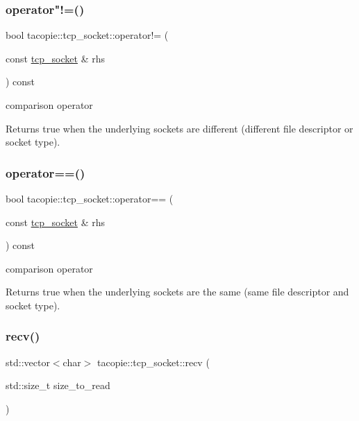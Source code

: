 \subsubsection{\texorpdfstring{operator"!=()}{operator!=()}}
{\footnotesize\ttfamily bool tacopie\+::tcp\+\_\+socket\+::operator!= (\begin{DoxyParamCaption}\item[{const \hyperlink{classtacopie_1_1tcp__socket}{tcp\+\_\+socket} \&}]{rhs }\end{DoxyParamCaption}) const}

comparison operator

\begin{DoxyReturn}{Returns}
true when the underlying sockets are different (different file descriptor or socket type). 
\end{DoxyReturn}
\mbox{\label{classtacopie_1_1tcp__socket_a69fde61058ab72d88ce48f557d8216cf}} 
\subsubsection{\texorpdfstring{operator==()}{operator==()}}
{\footnotesize\ttfamily bool tacopie\+::tcp\+\_\+socket\+::operator== (\begin{DoxyParamCaption}\item[{const \hyperlink{classtacopie_1_1tcp__socket}{tcp\+\_\+socket} \&}]{rhs }\end{DoxyParamCaption}) const}

comparison operator

\begin{DoxyReturn}{Returns}
true when the underlying sockets are the same (same file descriptor and socket type). 
\end{DoxyReturn}
\mbox{\label{classtacopie_1_1tcp__socket_a0d6d30258a902d12b3c2c62644756685}} 
\subsubsection{\texorpdfstring{recv()}{recv()}}
{\footnotesize\ttfamily std\+::vector$<$char$>$ tacopie\+::tcp\+\_\+socket\+::recv (\begin{DoxyParamCaption}\item[{std\+::size\+\_\+t}]{size\+\_\+to\+\_\+read }\end{DoxyParamCaption})}

